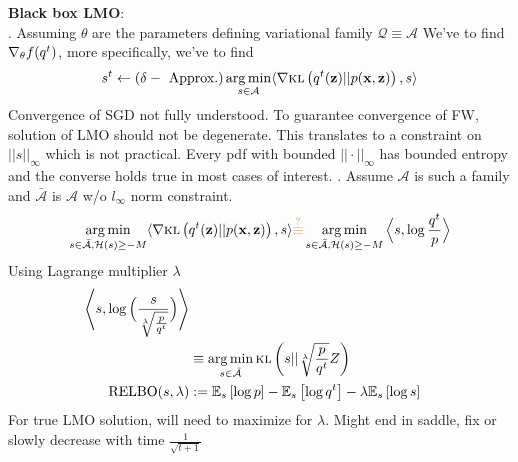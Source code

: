 \documentclass[summaries.tex]{subfiles}
\begin{document}
{\bf Black box LMO}: \\
. Assuming 
$\theta$ are the parameters defining variational family $\mathcal{Q} \equiv \mathcal{A}$
We've to find $\nabla_{\theta}f(q^t)$, more specifically, we've to find 
$$
s^t \gets (\delta-\text{ Approx.}) \operatorname*{arg\,min}\limits_{s \in \mathcal{A}}\langle 
\nabla \textsc{kl}\left(q^t(\mathbf{z}) || p(\mathbf{x}, \mathbf{z})\right), s \rangle
$$
Convergence of SGD not fully understood. To guarantee convergence of FW, solution of LMO should 
not be degenerate. This translates to a constraint on $||s||_{\infty}$ which is not practical.
Every pdf with bounded $||\cdot||_{\infty}$ has bounded entropy and the converse holds true in 
most cases of interest. . Assume $\mathcal{A}$ is such a family
and $\bar{\mathcal{A}}$ is $\mathcal{A}$ w/o $l_{\infty}$ norm constraint.  
$$
\argmin\limits_{s \in \bar{\mathcal{A}}, \mathcal{H}(s) \geq -M}\langle \grad 
\kl{q^t(\bz) || p(\bx, \bz)},
s \rangle \orange{\overset{?}{\equiv}}
\argmin\limits_{s \in \bar{\mathcal{A}}, \mathcal{H}(s) \geq -M}\Big\langle s, 
\log \frac{q^t}{p} \Big\rangle
$$
Using Lagrange multiplier $\lambda$
\begin{align}
  \Bigg\langle s, \log \Big(\frac{s}{\sqrt[\lambda]{\frac{p}{q^t}}} \Big)\Bigg\rangle \nonumber\\
&\equiv \operatorname*{arg\,min}\limits_{s \in \bar{\mathcal{A}}}\textsc{kl}\left(s||{\sqrt[\lambda]{\frac{p}{q^t}}} Z\right) \nonumber\\
  \text{RELBO}(s, \lambda) &:= \mathbb{E}_{s}\left[\log p\right] - \mathbb{E}_{s}\left[\log q^t\right] - \lambda\mathbb{E}_{s}\left[\log s\right]
\end{align}
For true LMO solution, will need to maximize for $\lambda$. Might end in saddle, fix or slowly decrease
with time $\frac{1}{\sqrt{t + 1}}$


\biblio
\end{document}
